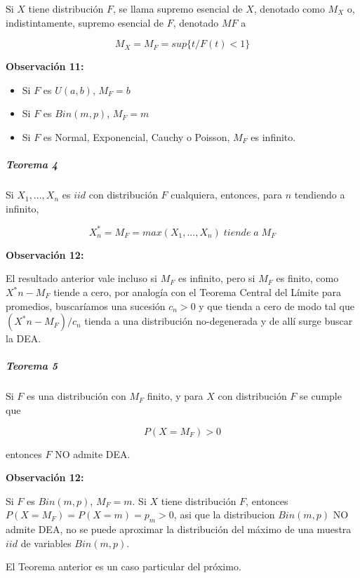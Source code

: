 \documentclass[
  oneside]{article}
\begin{document}
Si \(X\) tiene distribución \(F\), se llama supremo esencial de \(X\),
denotado como \(M_X\) o, indistintamente, supremo esencial de \(F\),
denotado \(MF\) a

\begin{equation}
M_X=M_F= sup\{t / F(t)<1\}\label{eq:Mx}
\end{equation}

\textbf{Observación 11:}

\begin{itemize}
\item Si $F$ es $U(a,b)$, $M_F=b$
\item Si $F$ es $Bin(m,p)$, $M_F=m$
\item Si $F$ es Normal, Exponencial, Cauchy o Poisson, $M_F$ es infinito.
\end{itemize}

\hypertarget{teorema-4}{%
\subparagraph{Teorema 4}\label{teorema-4}}

Si \(X_1,...,X_n\) es \(iid\) con distribución \(F\) cualquiera,
entonces, para \(n\) tendiendo a infinito,

\begin{equation}
X^*_n=M_F= max(X_1,...,X_n)\;tiende\;a\;M_F\label{eq:Xast}
\end{equation}

\textbf{Observación 12:}

El resultado anterior vale incluso si \(M_F\) es infinito, pero si
\(M_F\) es finito, como \(X^*n - M_F\) tiende a cero, por analogía con
el Teorema Central del Límite para promedios, buscaríamos una sucesión
\(c_n>0\) y que tienda a cero de modo tal que \((X^*n- M_F )/ c_n\)
tienda a una distribución no-degenerada y de allí surge buscar la DEA.

\hypertarget{teorema-5}{%
\subparagraph{Teorema 5}\label{teorema-5}}

Si \(F\) es una distribución con \(M_F\) finito, y para \(X\) con
distribución \(F\) se cumple que

\[
P(X=M_F)>0 
\]

entonces \(F\) NO admite DEA.

\textbf{Observación 12:}

Si \(F\) es \(Bin(m,p)\), \(M_F=m\). Si \(X\) tiene distribución \(F\),
entonces \(P( X=M_F)= P( X=m)= p_m>0\), asi que la distribucion
\(Bin(m,p)\) NO admite DEA, no se puede aproximar la distribución del
máximo de una muestra \(iid\) de variables \(Bin(m,p)\).

El Teorema anterior es un caso particular del próximo.
\end{document}
